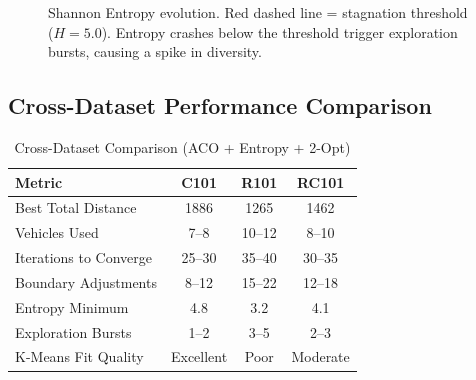\documentclass[10pt,conference]{IEEEtran}
\begin{document}
\begin{figure}[h]
\centering
{}
\caption{Shannon Entropy evolution. Red dashed line = stagnation threshold ($H=5.0$). Entropy crashes below the threshold trigger exploration bursts, causing a spike in diversity.}
\label{fig:entropy}
\end{figure}

\subsection{Cross-Dataset Performance Comparison}

\begin{table}[h]
\caption{Cross-Dataset Comparison (ACO + Entropy + 2-Opt)}
\label{tab:cross_dataset}
\begin{center}
\footnotesize
\begin{tabular}{|l|c|c|c|}
\hline
\textbf{Metric} & \textbf{C101} & \textbf{R101} & \textbf{RC101} \\
\hline
Best Total Distance & 1886 & 1265 & 1462 \\
Vehicles Used & 7--8 & 10--12 & 8--10 \\
Iterations to Converge & 25--30 & 35--40 & 30--35 \\
Boundary Adjustments & 8--12 & 15--22 & 12--18 \\
Entropy Minimum & 4.8 & 3.2 & 4.1 \\
Exploration Bursts & 1--2 & 3--5 & 2--3 \\
K-Means Fit Quality & Excellent & Poor & Moderate \\
\hline
\end{tabular}
\end{center}
\end{table}
\end{document}
